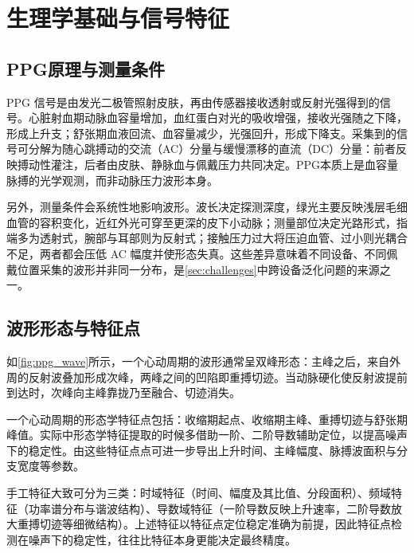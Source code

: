 \section{生理学基础与信号特征}
\label{sec:physio}

\subsection{PPG原理与测量条件}
\label{sec:ppg_principle}

PPG 信号是由发光二极管照射皮肤，再由传感器接收透射或反射光强得到的信号。心脏射血期动脉血容量增加，血红蛋白对光的吸收增强，接收光强随之下降，形成上升支；舒张期血液回流、血容量减少，光强回升，形成下降支\cite{allen2007photoplethysmography}。采集到的信号可分解为随心跳搏动的交流（AC）分量与缓慢漂移的直流（DC）分量：前者反映搏动性灌注，后者由皮肤、静脉血与佩戴压力共同决定。PPG本质上是血容量脉搏的光学观测，而非动脉压力波形本身\cite{reisner2008utility}。

另外，测量条件会系统性地影响波形。波长决定探测深度，绿光主要反映浅层毛细血管的容积变化，近红外光可穿至更深的皮下小动脉；测量部位决定光路形式，指端多为透射式，腕部与耳部则为反射式；接触压力过大将压迫血管、过小则光耦合不足，两者都会压低 AC 幅度并使形态失真\cite{allen2007photoplethysmography}。这些差异意味着不同设备、不同佩戴位置采集的波形并非同一分布，是\cref{sec:challenges}中跨设备泛化问题的来源之一。

\subsection{波形形态与特征点}
\label{sec:ppg_morphology}

如\cref{fig:ppg_wave}所示，一个心动周期的波形通常呈双峰形态：主峰之后，来自外周的反射波叠加形成次峰，两峰之间的凹陷即重搏切迹。当动脉硬化使反射波提前到达时，次峰向主峰靠拢乃至融合、切迹消失。

一个心动周期的形态学特征点包括：收缩期起点、收缩期主峰、重搏切迹与舒张期峰值。实际中形态学特征提取的时候多借助一阶、二阶导数辅助定位，以提高噪声下的稳定性\cite{cisnal2024robust}。由这些特征点点可进一步导出上升时间、主峰幅度、脉搏波面积与分支宽度等参数\cite{millasseau2006contour,cisnal2024robust}。

手工特征大致可分为三类：时域特征（时间、幅度及其比值、分段面积）、频域特征（功率谱分布与谐波结构）、导数域特征（一阶导数反映上升速率，二阶导数放大重搏切迹等细微结构）\cite{allen2007photoplethysmography,cisnal2024robust}。上述特征以特征点定位稳定准确为前提，因此特征点检测在噪声下的稳定性，往往比特征本身更能决定最终精度。

